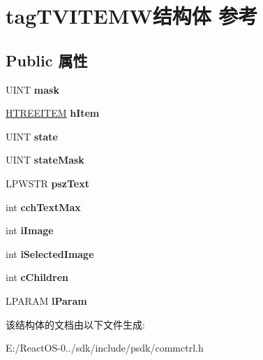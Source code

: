 \hypertarget{structtag_t_v_i_t_e_m_w}{}\section{tag\+T\+V\+I\+T\+E\+M\+W结构体 参考}
\label{structtag_t_v_i_t_e_m_w}
\subsection*{Public 属性}
\begin{DoxyCompactItemize}
\item 
\mbox{\label{structtag_t_v_i_t_e_m_w_a56c8b29638063cbf8cf7f4d41e7ec128}} 
U\+I\+NT {\bfseries mask}
\item 
\mbox{\label{structtag_t_v_i_t_e_m_w_a3527c8084eecb4e729272a1c559a5176}} 
\hyperlink{struct___t_r_e_e_i_t_e_m}{H\+T\+R\+E\+E\+I\+T\+EM} {\bfseries h\+Item}
\item 
\mbox{\label{structtag_t_v_i_t_e_m_w_ab247563f3d40c5a93771cc39125bcaf7}} 
U\+I\+NT {\bfseries state}
\item 
\mbox{\label{structtag_t_v_i_t_e_m_w_abb9fb8d803fb8029b3325f22eab905c9}} 
U\+I\+NT {\bfseries state\+Mask}
\item 
\mbox{\label{structtag_t_v_i_t_e_m_w_a6648532ad9ca1a04e2c6a97176673f4e}} 
L\+P\+W\+S\+TR {\bfseries psz\+Text}
\item 
\mbox{\label{structtag_t_v_i_t_e_m_w_a6bbe605c411fc021ddb6fb9f62a18768}} 
int {\bfseries cch\+Text\+Max}
\item 
\mbox{\label{structtag_t_v_i_t_e_m_w_a9ec0c431fd5da023722ec9f0499f4f76}} 
int {\bfseries i\+Image}
\item 
\mbox{\label{structtag_t_v_i_t_e_m_w_ab4cd9a0b4314e9545f64406ee9e8c9b5}} 
int {\bfseries i\+Selected\+Image}
\item 
\mbox{\label{structtag_t_v_i_t_e_m_w_ab15fe4382c534309d3269ad76fe8b208}} 
int {\bfseries c\+Children}
\item 
\mbox{\label{structtag_t_v_i_t_e_m_w_a4200b6bbc8a916c70c23ad4bd8b3cf83}} 
L\+P\+A\+R\+AM {\bfseries l\+Param}
\end{DoxyCompactItemize}


该结构体的文档由以下文件生成\+:\begin{DoxyCompactItemize}
\item 
E\+:/\+React\+O\+S-\/0../sdk/include/psdk/commctrl.\+h\end{DoxyCompactItemize}
